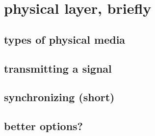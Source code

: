 
\section{physical layer, briefly}

\subsection{types of physical media}


\subsection{transmitting a signal}


\subsection{synchronizing (short)}


\subsection{better options?}

